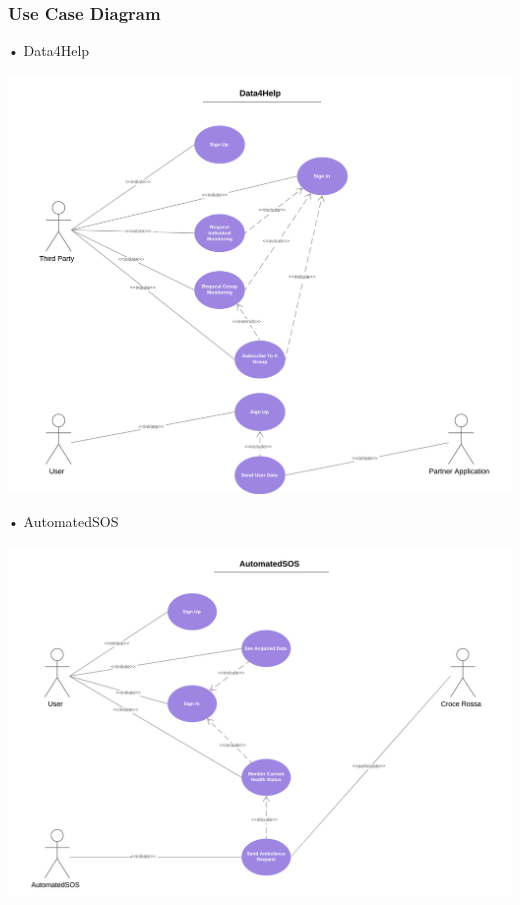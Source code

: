 \subsubsection{Use Case Diagram}
\begin{enumerate}
\begin{minipage}{\textwidth}
\FloatBarrier
\item[•]{\Large Data4Help}

\begin{center}
\includegraphics[scale=0.5]{Images/Data4HelpUseCaseDiagram.png}
\end{center}
\FloatBarrier
\end{minipage}


\begin{minipage}{\textwidth}
\item[•]{\Large AutomatedSOS}
\FloatBarrier
\begin{center}
\includegraphics[scale=0.5]{Images/AutomatedSOSCaseDiagram.png}
\end{center}
\FloatBarrier
\end{minipage}


\end{enumerate}
